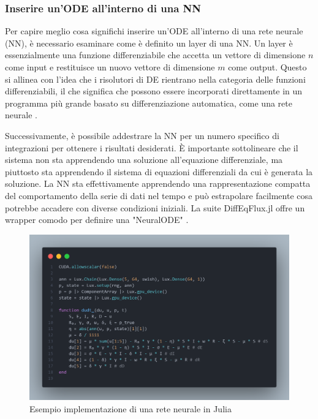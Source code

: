 \subsubsection{Inserire un'ODE all'interno di una NN}

Per capire meglio cosa significhi inserire un'ODE all'interno di una 
rete neurale (NN), è necessario esaminare come è definito un layer di 
una NN. Un layer è essenzialmente una funzione differenziabile che 
accetta un vettore di dimensione $n$ come input e restituisce un nuovo 
vettore di dimensione $m$ come output. Questo si allinea con l'idea che 
i risolutori di DE rientrano nella categoria delle funzioni 
differenziabili, il che significa che possono essere incorporati 
direttamente in un programma più grande basato su differenziazione 
automatica, come una rete neurale \cite{Flux.jl-2018} \cite{pal2023lux}. 

Successivamente, è possibile addestrare la NN per un numero specifico di 
integrazioni per ottenere i risultati desiderati. È importante 
sottolineare che il sistema non sta apprendendo una soluzione 
all'equazione differenziale, ma piuttosto sta apprendendo il sistema di 
equazioni differenziali da cui è generata la soluzione. La NN sta 
effettivamente apprendendo una rappresentazione compatta del comportamento 
della serie di dati nel tempo e può estrapolare facilmente cosa 
potrebbe accadere con diverse condizioni iniziali. La suite DiffEqFlux.jl 
offre un wrapper comodo per definire una "NeuralODE" \cite{rackauckas2019diffeqflux}.

\begin{figure}[H]
    \begin{center}
        \includegraphics[width=\textwidth]{img/fann.png}
        \caption{Esempio implementazione di una rete neurale in Julia}
        \label{fig:NN_Julia_example}
    \end{center}
\end{figure}


